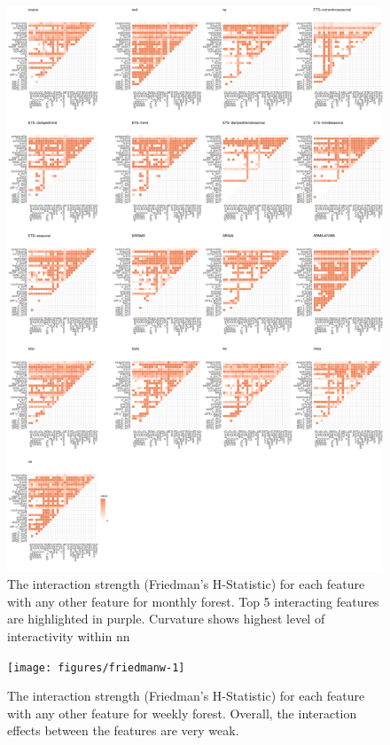 \documentclass[11pt,a4paper,]{article}
\begin{document}
\begin{figure}
\centering
\includegraphics{figures/friedmanm-1.pdf}
\caption{\label{fig:friedmanm}The interaction strength (Friedman's H-Statistic) for each feature with any other feature for monthly forest. Top 5 interacting features are highlighted in purple. Curvature shows highest level of interactivity within nn}
\end{figure}

\begin{figure}[h]

{\centering \texttt{[image: figures/friedmanw-1]} 

}

\caption{The interaction strength (Friedman's H-Statistic) for each feature with any other feature for weekly forest. Overall, the interaction effects between the features are very weak.}\label{fig:friedmanw}
\end{figure}
\end{document}

